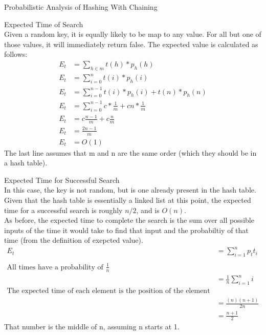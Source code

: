 \documentclass[12pt,twoside]{article}
\begin{document}
\begin{problems}
\problem Probabilistic Analysis of Hashing With Chaining\\
\begin{problemparts}
\problempart Expected Time of Search\\
Given a random key, it is equally likely to be map to any value.  For all but one of those values, it will immediately return false.  The expected value is calculated as follows:
\begin{align*}
E_{t} &= \sum_{h \in m} t(h) * p_h(h)\\
E_{t} &= \sum_{i = 0}^{n} t(i) * p_h(i)\\
E_{t} &= \sum_{i = 0}^{n-1} t(i) * p_h(i) + t(n)*p_h(n)\\
E_{t} &= \sum_{i = 0}^{n-1} c * \frac{1}{m} + cn * \frac{1}{m}\\
E_{t} &=  c \frac{n-1}{m} + c\frac{n}{m}\\
E_{t} &= \frac{2n-1}{m}\\
E_{t} &= O(1)
\end{align*}
The last line assumes that m and n are the same order (which they should be in a hash table).

\problempart Expected Time for Successful Search\\
In this case, the key is not random, but is one already present in the hash table.  Given that the hash table is essentially a linked list at this point, the expected time for a successful search is roughly $n/2$, and is $O(n)$.\\

As before, the expected time to complete the search is the sum over all possible inputs of the time it would take to find that input and the probabiltiy of that time (from the definition of exepcted value).\\

\begin{align*}
E_{t} &= \sum_{i=1}^{n} p_t t_i\\ \\\text{All times have a probability of $\frac{1}{n}$}\\
&= \frac{1}{n} \sum_{i=1}^{n} i\\ \text{The expected time of each element is the position of the element in the list.}\\
&= \frac{(n)(n+1)}{2n}\\
&= \frac{n+1}{2}
\end{align*}
That number is the middle of n, assuming n starts at 1.\\


\end{problemparts}
\end{problems}
\end{document}
